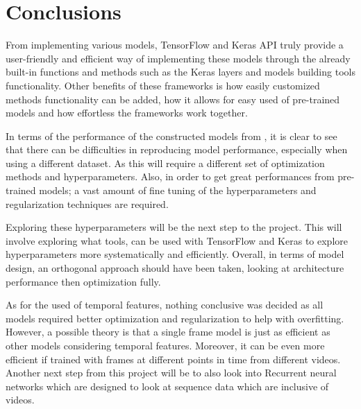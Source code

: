 \chapter{Conclusions}
\label{conclusion}

From implementing various models, TensorFlow and Keras API truly provide a user-friendly and efficient way of implementing these models through the already built-in functions and methods such as the Keras layers and models building tools functionality.  Other benefits of these frameworks is how easily customized methods functionality can be added, how it allows for easy used of pre-trained models and how effortless the frameworks work together. 
 
In terms of the performance of the constructed models from \citep{KarpathyCVPR14}, it is clear to see that there can be difficulties in reproducing model performance, especially when using a different dataset. As this will require a different set of optimization methods and hyperparameters.  Also, in order to get great performances from pre-trained models;  a vast amount of fine tuning of the hyperparameters and regularization techniques are required.

Exploring these hyperparameters will be the next step to the project. This will involve exploring what tools,  can be used with TensorFlow and Keras to explore hyperparameters more systematically and efficiently. Overall, in terms of model design, an orthogonal approach should have been taken, looking at architecture performance then optimization fully. 

As for the used of temporal features, nothing conclusive was decided as all models required better optimization and regularization to help with overfitting. However, a possible theory is that a single frame model is just as efficient as other models considering temporal features. Moreover, it can be even more efficient if trained with frames at different points in time from different videos. Another next step from this project will be to also look into Recurrent neural networks which are designed to look at sequence data which are inclusive of videos. 